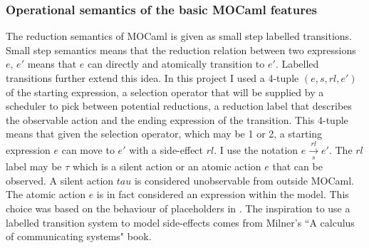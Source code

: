 \documentclass[12pt,twoside,notitlepage]{report}
\theoremstyle{plain}%
\theoremstyle{definition}
\theoremstyle{remark}
\begin{document}
\subsubsection{Operational semantics of the basic MOCaml features}

The reduction semantics of MOCaml is given as small step labelled transitions. Small step semantics means that the reduction relation between two expressions $ e, \, e' $ means that $ e $ can directly and atomically transition to $ e' $. Labelled transitions further extend this idea. In this project I used a 4-tuple $ (e, s, rl, e') $ of the starting expression, a selection operator that will be supplied by a scheduler to pick between potential reductions, a reduction label that describes the observable action and the ending expression of the transition. This 4-tuple means that given the selection operator, which may be 1 or 2, a starting expression $ e $  can move to $ e' $ with a side-effect $ rl $. I use the notation $ e \overset{rl}{\underset{s}{\longrightarrow}} e' $. The $ rl $ label may be $ \tau $ which is a silent action or an atomic action $ e $ that can be observed. A silent action $tau$ is considered unobservable from outside MOCaml. The atomic action $e$ is in fact considered an expression within the model.  This choice was based on the behaviour of placeholders in . The inspiration to use a labelled transition system to model side-effects comes from Milner's ``A calculus of communicating systems" book\cite{milner1982calculus}.



\end{document}
